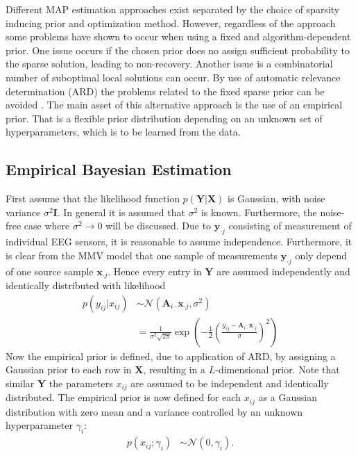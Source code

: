 Different MAP estimation approaches exist separated by the choice of sparsity inducing prior and optimization method. 
However, regardless of the approach some problems have shown to occur when using a fixed and algorithm-dependent prior. 
One issue occurs if the chosen prior does no assign sufficient probability to the sparse solution, leading to non-recovery.
Another issue is a combinatorial number of suboptimal local solutions can occur.
By use of automatic relevance determination (ARD) the problems related to the fixed sparse prior can be avoided \cite[p. 20]{phd_wipf}. 
The main asset of this alternative approach is the use of an empirical prior. 
That is a flexible prior distribution depending on an unknown set of hyperparameters, which is to be learned from the data.
 
\subsection{Empirical Bayesian Estimation}\label{seg:EBE}
First assume that the likelihood function $p(\mathbf{Y} \vert \mathbf{X})$ is Gaussian, with noise variance $\sigma^2\textbf{I}$. In general it is assumed that $\sigma^2$ is known. Furthermore, the noise-free case where $\sigma^2 \rightarrow 0$ will be discussed. 
Due to $\textbf{y}_{\cdot j}$ consisting of measurement of individual EEG sensors, it is reasonable to assume independence. Furthermore, it is clear from the MMV model that one sample of measurements $\textbf{y}_{\cdot j}$ only depend of one source sample $\textbf{x}_{\cdot j}$. Hence every entry in $\textbf{Y}$ are assumed independently and identically distributed with likelihood 
\begin{align*}
p(y_{ij}\vert x_{ij}) &\sim \mathcal{N}(\mathbf{A}_{i \cdot}\textbf{x}_{\cdot j}, \sigma^2) \\
& = \frac{1}{\sigma^2\sqrt{2\pi}}\exp\left( -\frac{1}{2}\left( \frac{y_{ij}- \mathbf{A}_{i \cdot}\textbf{x}_{\cdot j}}{\sigma}\right)^{2}\right)
\end{align*}
Now the empirical prior is defined, due to application of ARD, by assigning a Gaussian prior to each row in $\textbf{X}$, resulting in a $L$-dimensional prior. Note that similar $\textbf{Y}$ the parameters $x_{ij}$ are assumed to be independent and identically distributed.
The empirical prior is now defined for each $x_{ij}$ as a Gaussian distribution with zero mean and a variance controlled by an unknown hyperparameter $\gamma_i$:
\begin{align*}
p (x_{i j} ; \gamma_i) &\sim \mathcal{N}(0, \gamma_i).
\end{align*}
